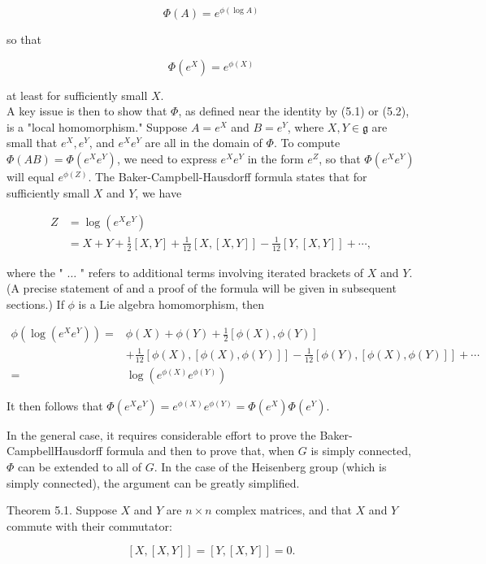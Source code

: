 \documentclass[10pt, letterpaper]{article}
\begin{document}
$$
\Phi(A)=e^{\phi(\log A)}
$$

so that

$$
\Phi\left(e^{X}\right)=e^{\phi(X)}
$$

at least for sufficiently small $X$.\\
A key issue is then to show that $\Phi$, as defined near the identity by (5.1) or (5.2), is a "local homomorphism." Suppose $A=e^{X}$ and $B=e^{Y}$, where $X, Y \in \mathfrak{g}$ are small that $e^{X}, e^{Y}$, and $e^{X} e^{Y}$ are all in the domain of $\Phi$. To compute $\Phi(A B)=\Phi\left(e^{X} e^{Y}\right)$, we need to express $e^{X} e^{Y}$ in the form $e^{Z}$, so that $\Phi\left(e^{X} e^{Y}\right)$ will equal $e^{\phi(Z)}$. The Baker-Campbell-Hausdorff formula states that for sufficiently small $X$ and $Y$, we have

$$
\begin{aligned}
Z & =\log \left(e^{X} e^{Y}\right) \\
& =X+Y+\frac{1}{2}[X, Y]+\frac{1}{12}[X,[X, Y]]-\frac{1}{12}[Y,[X, Y]]+\cdots,
\end{aligned}
$$

where the " $\ldots$ " refers to additional terms involving iterated brackets of $X$ and $Y$. (A precise statement of and a proof of the formula will be given in subsequent sections.) If $\phi$ is a Lie algebra homomorphism, then

$$
\begin{aligned}
\phi\left(\log \left(e^{X} e^{Y}\right)\right)= & \phi(X)+\phi(Y)+\frac{1}{2}[\phi(X), \phi(Y)] \\
& +\frac{1}{12}[\phi(X),[\phi(X), \phi(Y)]]-\frac{1}{12}[\phi(Y),[\phi(X), \phi(Y)]]+\cdots \\
= & \log \left(e^{\phi(X)} e^{\phi(Y)}\right)
\end{aligned}
$$

It then follows that $\Phi\left(e^{X} e^{Y}\right)=e^{\phi(X)} e^{\phi(Y)}=\Phi\left(e^{X}\right) \Phi\left(e^{Y}\right)$.

In the general case, it requires considerable effort to prove the Baker-CampbellHausdorff formula and then to prove that, when $G$ is simply connected, $\Phi$ can be extended to all of $G$. In the case of the Heisenberg group (which is simply connected), the argument can be greatly simplified.

Theorem 5.1. Suppose $X$ and $Y$ are $n \times n$ complex matrices, and that $X$ and $Y$ commute with their commutator:

$$
[X,[X, Y]]=[Y,[X, Y]]=0 .
$$
\end{document}
